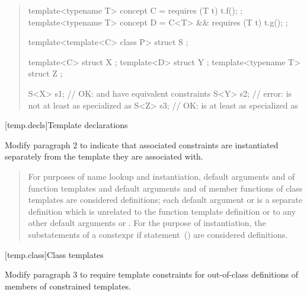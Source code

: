 \begin{quote}
\begin{addedblock}
\enterexample
\begin{codeblock}
template<typename T> concept C = requires (T t) { t.f(); };
template<typename T> concept D = C<T> && requires (T t) { t.g(); };

template<template<C> class P>
  struct S { };

template<C> struct X { };
template<D> struct Y { };
template<typename T> struct Z { };

S<X> s1; // OK:  and  have equivalent constraints
S<Y> s2; // error:  is not at least as specialized as 
S<Z> s3; // OK:  is at least as specialized as 
\end{codeblock}
\exitexample
\end{addedblock}
\end{quote}


\setcounter{section}{4}
[temp.decls]{Template declarations}

Modify paragraph 2 to indicate that associated constraints are
instantiated separately from the template they are associated with.

\begin{quote}
\setcounter{Paras}{1}
\pnum
For purposes of name lookup and instantiation,
default arguments 
and  of function templates and 
default arguments and 
 of member functions of class templates 
are considered definitions;
each default argument or 
 is a separate definition which is unrelated to
the function template definition or to any other default arguments or
.
For the purpose of instantiation, the substatements of a constexpr if
statement~() are considered definitions.
\end{quote}


[temp.class]{Class templates}

Modify paragraph 3 to require template constraints for out-of-class
definitions of members of constrained templates. 

